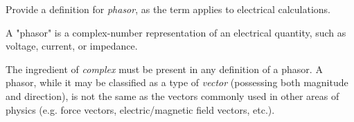 

Provide a definition for {\it phasor}, as the term applies to electrical calculations.







A "phasor" is a complex-number representation of an electrical quantity, such as voltage, current, or impedance.







The ingredient of {\it complex} must be present in any definition of a phasor.  A phasor, while it may be classified as a type of {\it vector} (possessing both magnitude and direction), is not the same as the vectors commonly used in other areas of physics (e.g. force vectors, electric/magnetic field vectors, etc.).





